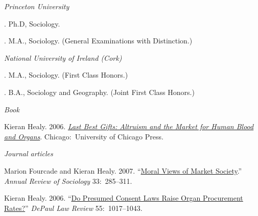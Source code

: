 \documentclass[11pt]{article}
\begin{document}
\bigskip



\noindent\emph{Princeton University \vspace{0.01in}}

. Ph.D, Sociology. %



. M.A., Sociology. (General Examinations with Distinction.)


\medskip
\noindent\emph{National University of Ireland (Cork)\vspace{0.02in}}

. M.A., Sociology. (First Class Honors.) \vspace{0.01in}


. B.A., Sociology and Geography. (Joint First Class Honors.) 

\bigskip
 
\medskip
\noindent\emph{Book \vspace{0.01in}}

\ind  Kieran Healy. 2006. \emph{\href{http://www.lastbestgifts.com}{Last Best Gifts: Altruism and the Market for Human Blood and Organs}}. Chicago:~University of Chicago Press. \vspace{-0.075in}
 
\normalsize

\bigskip
\noindent\emph{Journal articles \vspace{0.05in}}
 

\ind Marion Fourcade and Kieran Healy. 2007. ``\href{http://arjournals.annualreviews.org/doi/pdf/10.1146/annurev.soc.33.040406.131642}{Moral Views of Market Society}.'' \emph{Annual Review of Sociology} 33:~285--311. 

\ind Kieran Healy. 2006. ``\href{http://www.kieranhealy.org/files/papers/presumed-consent.pdf}{Do Presumed Consent Laws Raise Organ Procurement Rates?}'' \emph{DePaul Law Review} 55:~1017--1043. 
\end{document}
